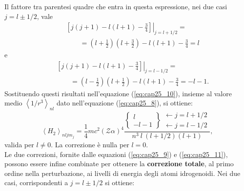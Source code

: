 Il fattore tra parentesi quadre che entra in questa espressione, nei due casi $j=l\pm1/2$, vale 
\begin{eqnarray} 
& &\left. \left[ j(j+1)-l(l+1)-\frac{3}{4}  \right]  \right|_{j=l+1/2} = \nonumber \\ 
& &\qquad = \left( l+\frac{1}{2} \right) \left( l+\frac{3}{2}\right)-l\left(l+1 \right) -\frac{3}{4}=l
\end{eqnarray}
e
\begin{eqnarray} 
& &\left. \left[ j(j+1)-l(l+1)-\frac{3}{4}  \right] \right|_{j=l-1/2} = \nonumber  \\ 
& &\qquad = \left( l-\frac{1}{2} \right) \left(l+\frac{1}{2} \right)-l\left( l+1 \right) -\frac{3}{4}=-l-1 .
\end{eqnarray}
Sostituendo questi risultati nell'equazione (\ref{eq:cap25_10}), insieme al valore medio $\left< 1/r^3 \right>_{nl}$ dato nell'equazione (\ref{eq:cap25_8}), si ottiene:
\begin{equation} \label{eq:cap25_11}
\left< H_2 \right>_{nljm_j}=\frac{1}{4}mc^2\left( \mathcal{Z}\alpha \right)^4 \frac{\begin{Bmatrix}
      l  \\ 
      -l-1 
    \end{Bmatrix}
    \begin{matrix}
    \leftarrow j=l+1/2 \\
    \leftarrow j=l-1/2
    \end{matrix} }{n^3 \ l \ \left(l+1/2 \right) \left( l+1 \right)} ,
\end{equation}
valida per $l\neq0$. La correzione è nulla per $l=0$. \\
Le due correzioni, fornite dalle equazioni (\ref{eq:cap25_9}) e (\ref{eq:cap25_11}), possono essere infine combinate per ottenere la \textbf{correzione totale}, al primo ordine nella perturbazione, ai livelli di energia degli atomi idrogenoidi. Nei due casi, corrispondenti a $j=l\pm1/2$ si ottiene:

